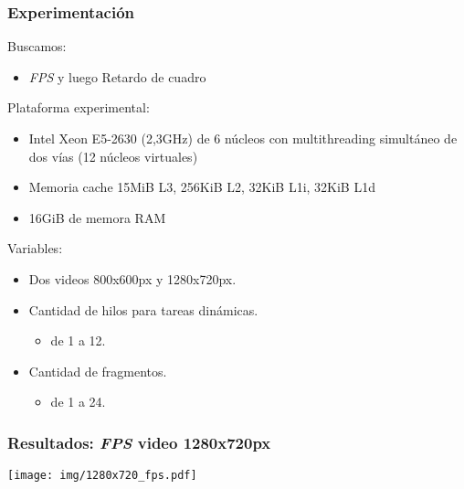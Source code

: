 \documentclass[11pt,a4paper,spanish]{beamer}
\begin{document}
\begin{frame}

\frametitle{Experimentación}

Buscamos:

\begin{itemize}

	\item \emph{FPS} y luego Retardo de cuadro

\end{itemize}

Plataforma experimental:

\begin{itemize}

	\item Intel Xeon E5-2630 (2,3GHz) de 6 núcleos con multithreading
		simultáneo de dos vías (12 núcleos virtuales)

	\item Memoria cache 15MiB L3, 256KiB L2, 32KiB L1i, 32KiB L1d

	\item 16GiB de memora RAM

\end{itemize}

Variables:

\begin{itemize}

        \item Dos videos 800x600px y 1280x720px.

        \item Cantidad de hilos para tareas dinámicas.

	\begin{itemize}

        \item de 1 a 12.

	\end{itemize}

	\item Cantidad de fragmentos.

	\begin{itemize}

        	\item de 1 a 24.

	\end{itemize}

\end{itemize}

\end{frame}

\begin{frame}

\frametitle{Resultados: \emph{FPS} video 1280x720px}

\texttt{[image: img/1280x720\_fps.pdf]}

\end{frame}
\end{document}

